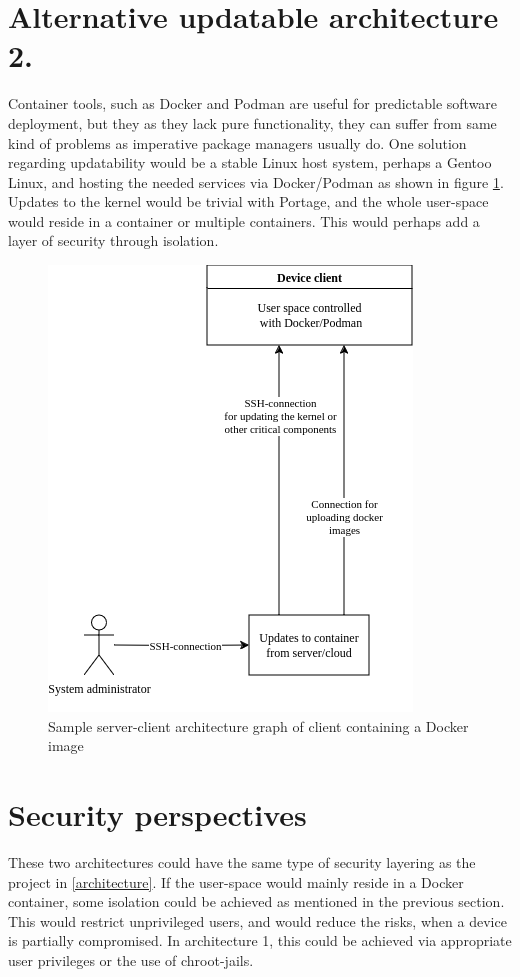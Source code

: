\section{Alternative updatable architecture 2.}
Container tools, such as Docker and Podman are useful for predictable software deployment, but they as they lack pure functionality, they can suffer from same kind of problems as imperative package managers usually do. One solution regarding updatability would be a stable Linux host system, perhaps a Gentoo Linux, and hosting the needed services via Docker/Podman as shown in figure \ref{dockerarchitecture}. Updates to the kernel would be trivial with Portage, and the whole user-space would reside in a container or multiple containers. This would perhaps add a layer of security through isolation.
\begin{figure}[H]
\centering
\includegraphics[scale=0.7]{latex/kuvat/dockerarchitecture.drawio.png}
\caption{Sample server-client architecture graph of client containing a Docker image}
\label{dockerarchitecture}
\end{figure}

\section{Security perspectives}
These two architectures could have the same type of security layering as the project in \ref{architecture}. If the user-space would mainly reside in a Docker container, some isolation could be achieved as mentioned in the previous section. This would restrict unprivileged users, and would reduce the risks, when a device is partially compromised. In architecture 1, this could be achieved via appropriate user privileges or the use of chroot-jails. 